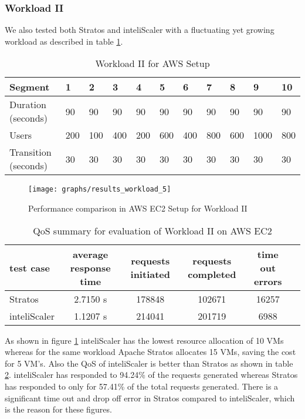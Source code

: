 \pagebreak

\subsubsection{Workload II}
We also tested both Stratos and inteliScaler with a fluctuating yet growing workload as described in table \ref{table:workload_5}.
\begin{table}[h!]
\centering
\caption{Workload II for AWS Setup}
\label{table:workload_5}
\begin{tabular}{|l|l|l|l|l|l|l|l|l|l|l|}
\hline
Segment & 1 & 2 & 3 & 4 & 5 & 6 & 7 & 8 & 9 & 10\\ \hline
Duration (seconds) & 90 & 90 & 90 & 90 & 90 & 90 & 90 & 90 & 90 & 90 \\ \hline
Users & 200 & 100 & 400 & 200 & 600 & 400 & 800 & 600 & 1000 & 800   \\ \hline
Transition (seconds) & 30 & 30 & 30 & 30 & 30 & 30 & 30 & 30 & 30 & 30  \\ \hline
\end{tabular}
\end{table}
\begin{figure}[h!]
\centering
\captionsetup{justification=centering,margin=1cm}
\texttt{[image: graphs/results\_workload\_5]}
\caption{Performance comparison in AWS EC2 Setup for Workload II}
\label{graph:workload_5}
\end{figure}


\begin{table}[h!]
\centering
\caption{QoS summary for evaluation of Workload II on AWS EC2}
\label{table:analysis_qos_workload_5}
\begin{tabular}{|l|c|c|c|c|c|}
\hline

test case & average  response time & requests initiated & requests completed & time out errors \\ \hline

Stratos & 2.7150 s & 178848 & 102671 & 16257\\ \hline

inteliScaler & 1.1207 s & 214041 & 201719 & 6988\\ \hline

\end{tabular}
\end{table}

As shown in figure \ref{graph:workload_5} inteliScaler has the lowest resource allocation of 10 VMs whereas for the same workload Apache Stratos allocates 15 VMs, saving the cost for 5 VM's. Also the QoS of inteliScaler is better than Stratos as shown in table \ref{table:analysis_qos_workload_5}. inteliScaler has responded to 94.24\% of the requests generated whereas Stratos has responded to only for 57.41\% of the total requests generated. There is a significant time out and drop off error in Stratos compared to inteliScaler, which is the reason for these figures. 
